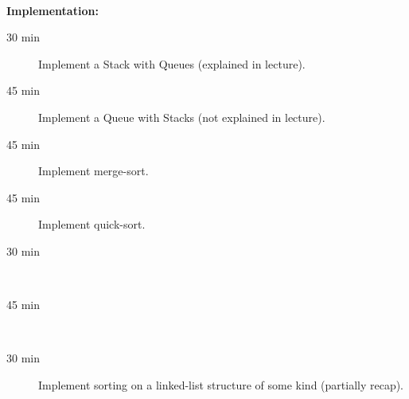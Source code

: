 \hfill\\
\textbf{Implementation:}\\
\begin{description}
	\item[30 min] Implement a Stack with Queues (explained in lecture).
	\item[45 min] Implement a Queue with Stacks (not explained in lecture).
	\item[45 min] Implement merge-sort.
	\item[45 min] Implement quick-sort.
	\item[30 min] \hfill\\
	\item[45 min] \hfill\\
	\item[30 min] Implement sorting on a linked-list structure of some kind (partially recap).
\end{description}
